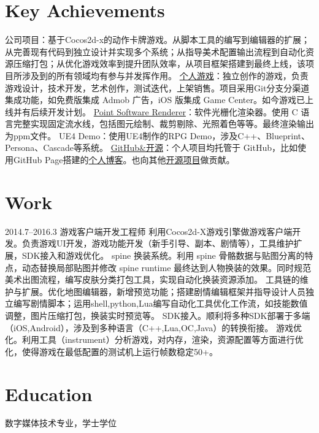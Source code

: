 \documentclass[full]{rvca}
\begin{document}
\section{Key Achievements}

\achievements
{公司项目：基于Cocos2d-x的动作卡牌游戏。从脚本工具的编写到编辑器的扩展；从完善现有代码到独立设计并实现多个系统；从指导美术配置输出流程到自动化资源压缩打包；从优化游戏效率到提升团队效率，从项目框架搭建到最终上线，该项目所涉及到的所有领域均有参与并发挥作用。}
{\href{http://a.app.qq.com/o/simple.jsp?pkgname=com.kode.Thirteen}{个人游戏}：独立创作的游戏，负责游戏设计，技术开发，艺术创作，测试迭代，上架销售。项目采用Git分支分渠道集成功能，如免费版集成 Admob 广告，iOS 版集成 Game Center。如今游戏已上线并有后续开发计划。}
{\href{https://github.com/keyring/point}{Point Software Renderer}：软件光栅化渲染器。使用 C 语言完整实现固定流水线，包括图元绘制、裁剪剔除、光照着色等等。最终渲染输出为ppm文件。}
{UE4 Demo：使用UE4制作的RPG Demo，涉及C++、Blueprint、Persona、Cascade等系统。}
{\href{http://github.com/keyring}{GitHub\&开源}：个人项目均托管于 GitHub，比如使用GitHub Page搭建的\href{http://www.photoneray.com}{个人博客}。也向其他\href{https://github.com/cloudwu/lua53doc/graphs/contributors}{开源项目}做贡献。}
{}

\section{Work}


{2014.7--2016.3}%
{游戏客户端开发工程师} %
{利用Cocos2d-X游戏引擎做游戏客户端开发。负责游戏UI开发，游戏功能开发（新手引导、副本、剧情等），工具维护扩展，SDK接入和游戏优化。}%
{spine 换装系统。利用 spine 骨骼数据与贴图分离的特点，动态替换局部贴图并修改 spine runtime 最终达到人物换装的效果。同时规范美术出图流程，编写皮肤分类打包工具，实现自动化换装资源添加。}
{工具链的维护与扩展。优化地图编辑器，新增预览功能；搭建剧情编辑框架并指导设计人员独立编写剧情脚本；运用shell,python,Lua编写自动化工具优化工作流，如技能数值调整，图片压缩打包，换装实时预览等。}
{SDK接入。顺利将多种SDK部署于多端（iOS,Android），涉及到多种语言（C++,Lua,OC,Java）的转换衔接。}
{游戏优化。利用工具（instrument）分析游戏，对内存，渲染，资源配置等方面进行优化，使得游戏在最低配置的测试机上运行帧数稳定50+。}
{}

\section{Education}

数字媒体技术专业，学士学位
\end{document}
